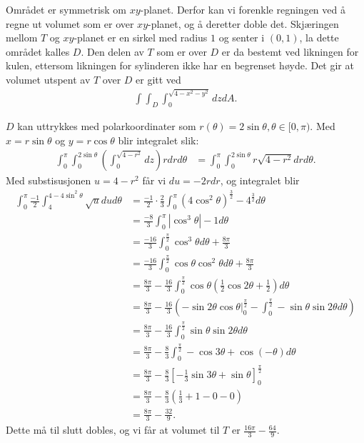 \documentclass[11pt, a4paper, norsk]{NTNUoving}
\begin{document}
\begin{oppgave}
    Området er symmetrisk om $xy$-planet. Derfor kan vi forenkle regningen ved å regne ut volumet som er over $xy$-planet, og å deretter doble det. Skjæringen mellom $T$ og $xy$-planet er en sirkel med radius $1$ og senter i $(0, 1)$, la dette området kalles $D$. Den delen av $T$ som er over $D$ er da bestemt ved likningen for kulen, ettersom likningen for sylinderen ikke har en begrenset høyde. Det gir at volumet utspent av $T$ over $D$ er gitt ved
    \begin{align*}
        \int\int_D\int_0^{\sqrt{4-x^2-y^2}}dzdA.
    \end{align*}
    
    $D$ kan uttrykkes med polarkoordinater som $r(\theta )=2\sin\theta, \theta \in [0, \pi)$. Med $x=r\sin\theta$ og $y=r\cos\theta$ blir integralet slik:
    \begin{align*}
        \int_0^{\pi}\int_0^{2\sin\theta}\left(\int_0^{\sqrt{4-r^2}}dz\right)rdrd\theta &=\int_0^{\pi}\int_0^{2\sin\theta}r\sqrt{4-r^2}drd\theta.
    \end{align*}
    Med substisusjonen $u=4-r^2$ får vi $du=-2rdr$, og integralet blir
    \begin{align*}
        \int_0^{\pi}\frac{-1}{2}\int_4^{4-4\sin^2\theta}\sqrt{u}dud\theta&=\frac{-1}{2}\cdot \frac{2}{3}\int_0^\pi \left(4\cos^2\theta \right)^\frac{3}{2}-4^\frac{3}{2}d\theta
        \\&=\frac{-8}{3}\int_0^\pi |\cos^3\theta|-1d\theta
        \\&=\frac{-16}{3}\int_0^\frac{\pi}{2} \cos^3\theta d\theta+\frac{8\pi}{3}
        \\&=\frac{-16}{3}\int_0^\frac{\pi}{2} \cos\theta\cos^2\theta d\theta +\frac{8\pi}{3}
        \\&=\frac{8\pi}{3}-\frac{16}{3}\int_0^\frac{\pi}{2} \cos\theta\left( \frac{1}{2}\cos 2\theta +\frac{1}{2}\right) d\theta
        \\&=\frac{8\pi}{3}-\frac{16}{3}\left(-\sin 2\theta\cos\theta \bigg|_0^\frac{\pi}{2} -\int_0^\frac{\pi}{2} -\sin\theta \sin 2\theta d\theta\right)
        \\&=\frac{8\pi}{3}-\frac{16}{3}\int_0^\frac{\pi}{2} \sin\theta \sin 2\theta d\theta
        \\&=\frac{8\pi}{3}-\frac{8}{3}\int_0^\frac{\pi}{2}-\cos 3\theta +\cos(-\theta) d\theta
        \\&=\frac{8\pi}{3}-\frac{8}{3}\left[-\frac{1}{3}\sin 3\theta + \sin\theta \right]_0^\frac{\pi}{2}
        \\&=\frac{8\pi}{3}-\frac{8}{3}\left(\frac{1}{3} +1 -0-0\right)
        \\&=\frac{8\pi}{3}-\frac{32}{9}.
    \end{align*}
    Dette må til slutt dobles, og vi får at volumet til $T$ er $\frac{16\pi}{3}-\frac{64}{9}$.
\end{oppgave}
\end{document}

